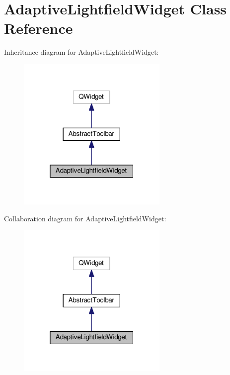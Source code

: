 \hypertarget{classAdaptiveLightfieldWidget}{}\section{Adaptive\+Lightfield\+Widget Class Reference}
\label{classAdaptiveLightfieldWidget}


Inheritance diagram for Adaptive\+Lightfield\+Widget\+:\nopagebreak
\begin{figure}[H]
\begin{center}
\leavevmode
\includegraphics[width=205pt]{classAdaptiveLightfieldWidget__inherit__graph}
\end{center}
\end{figure}


Collaboration diagram for Adaptive\+Lightfield\+Widget\+:\nopagebreak
\begin{figure}[H]
\begin{center}
\leavevmode
\includegraphics[width=205pt]{classAdaptiveLightfieldWidget__coll__graph}
\end{center}
\end{figure}
